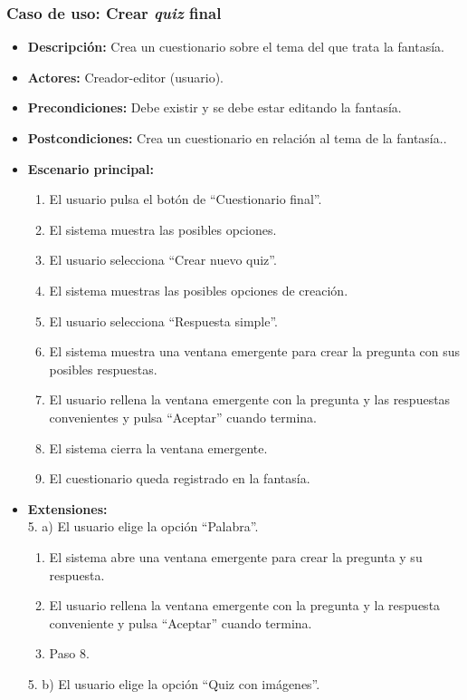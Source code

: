 \subsubsection{Caso de uso: Crear \textit{quiz} final}
\begin{itemize}
	\item \textbf{Descripción:} Crea un cuestionario sobre el tema del que trata la fantasía.
	\item \textbf{Actores:} Creador-editor (usuario).
	\item \textbf{Precondiciones:} Debe existir y se debe estar editando la fantasía.
	\item \textbf{Postcondiciones:} Crea un cuestionario en relación al tema de la fantasía..
	\item \textbf{Escenario principal:}
	\begin{enumerate}
		\item El usuario pulsa el botón de ``Cuestionario final''.
		\item El sistema muestra las posibles opciones.
		\item El usuario selecciona ``Crear nuevo quiz''.
		\item El sistema muestras las posibles opciones de creación.
		\item El usuario selecciona ``Respuesta simple''.
		\item El sistema muestra una ventana emergente para crear la pregunta con sus posibles respuestas.
		\item El usuario rellena la ventana emergente con la pregunta y las respuestas convenientes y pulsa ``Aceptar'' cuando termina.
		\item El sistema cierra la ventana emergente.
		\item El cuestionario queda registrado en la fantasía.
	\end{enumerate}
	\item \textbf{Extensiones:} \\5. a) El usuario elige la opción ``Palabra''.
	\begin{enumerate}
		\item El sistema abre una ventana emergente para crear la pregunta y su respuesta.
		\item El usuario rellena la ventana emergente con la pregunta y la respuesta conveniente y pulsa ``Aceptar'' cuando termina.
		\item Paso 8.
	\end{enumerate}
	5. b) El usuario elige la opción ``Quiz con imágenes''.
	\begin{enumerate}

\end{enumerate}
\end{itemize}
